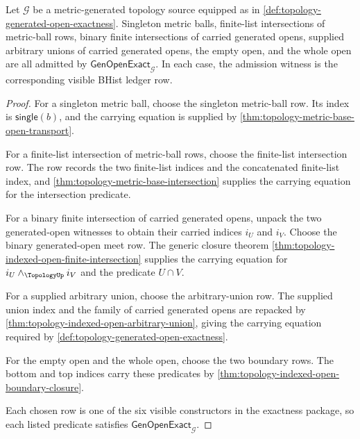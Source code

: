 \begin{theorem}
\label{thm:topology-generated-open-classification-completeness}
Let $\mathcal{G}$ be a metric-generated topology source equipped as in \autoref{def:topology-generated-open-exactness}. Singleton metric balls, finite-list intersections of metric-ball rows, binary finite intersections of carried generated opens, supplied arbitrary unions of carried generated opens, the empty open, and the whole open are all admitted by $\mathsf{GenOpenExact}_{\mathcal{G}}$. In each case, the admission witness is the corresponding visible BHist ledger row.
\end{theorem}
\begin{proof}
For a singleton metric ball, choose the singleton metric-ball row. Its index is $\mathsf{single}(b)$, and the carrying equation is supplied by \autoref{thm:topology-metric-base-open-transport}.

For a finite-list intersection of metric-ball rows, choose the finite-list intersection row. The row records the two finite-list indices and the concatenated finite-list index, and \autoref{thm:topology-metric-base-intersection} supplies the carrying equation for the intersection predicate.

For a binary finite intersection of carried generated opens, unpack the two generated-open witnesses to obtain their carried indices $i_U$ and $i_V$. Choose the binary generated-open meet row. The generic closure theorem \autoref{thm:topology-indexed-open-finite-intersection} supplies the carrying equation for $i_U\wedge_{\TopologyUp}i_V$ and the predicate $U\cap V$.

For a supplied arbitrary union, choose the arbitrary-union row. The supplied union index and the family of carried generated opens are repacked by \autoref{thm:topology-indexed-open-arbitrary-union}, giving the carrying equation required by \autoref{def:topology-generated-open-exactness}.

For the empty open and the whole open, choose the two boundary rows. The bottom and top indices carry these predicates by \autoref{thm:topology-indexed-open-boundary-closure}.

Each chosen row is one of the six visible constructors in the exactness package, so each listed predicate satisfies $\mathsf{GenOpenExact}_{\mathcal{G}}$.
\end{proof}

